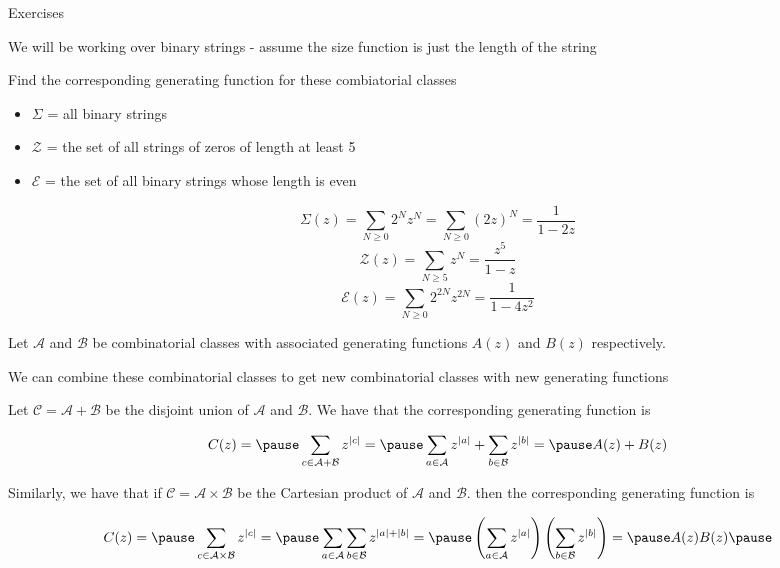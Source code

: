 \documentclass[aspectratio=169]{beamer}
\begin{document}
\begin{frame}{Exercises}

We will be working over binary strings - assume the size function is just the length of the string

Find the corresponding generating function for these combiatorial classes
\begin{itemize}
    \item  $\Sigma$ = all binary strings
    \item  $\mathcal{Z}$ = the set of all strings of zeros of length at least 5
    \item  $\mathcal{E}$ = the set of all binary strings whose length is even
\end{itemize}

\end{frame}

\begin{frame}
$$ \Sigma(z) = \sum_{N \ge 0} 2^N z^N = \sum_{N \ge 0} (2z)^N = \frac{1}{1-2z} $$
$$ \mathcal{Z}(z) = \sum_{N \ge 5} z^N = \frac{z^5}{1-z}  $$
$$ \mathcal{E}(z) = \sum_{N \ge 0} 2^{2N} z^{2N} = \frac{1}{1-4z^2} $$
\end{frame}

\begin{frame}

Let $\mathcal{A}$ and $\mathcal{B}$ be combinatorial classes with associated generating functions $A(z)$ and $B(z)$ respectively. 
\vspace{25pt}

We can combine these combinatorial classes to get new combinatorial classes with new generating functions

\end{frame}

\begin{frame}

Let $ \mathcal{C} = \mathcal{A} + \mathcal{B} $ be the disjoint union of $\mathcal{A}$ and $\mathcal{B} $. We have that the corresponding generating function is 

$$ C(z) = \pause \sum_{c \in \mathcal{A} + \mathcal{B}} z^{|c|} = \pause \sum_{a \in \mathcal{A}} z^{|a|} + \sum_{b \in \mathcal{B}} z^{|b|} = \pause A(z) + B(z) $$

\end{frame}

\begin{frame}
Similarly, we have that if $ \mathcal{C} = \mathcal{A} \times \mathcal{B} $ be the Cartesian product of $\mathcal{A}$ and $\mathcal{B}$. then the corresponding generating function is

\vspace{25pt}

$$ C(z) = \pause \sum_{c \in \mathcal{A} \times \mathcal{B}} z^{|c|} = \pause \sum_{a \in \mathcal{A}} \sum_{b \in \mathcal{B}} z^{|a|+|b|}= \pause \left(  \sum_{a \in \mathcal{A}} z^{|a| }\right) \left( \sum_{b \in \mathcal{B}} z^{|b|}\right) = \pause A(z) B(z) \pause $$ 
\end{frame}
\end{document}
